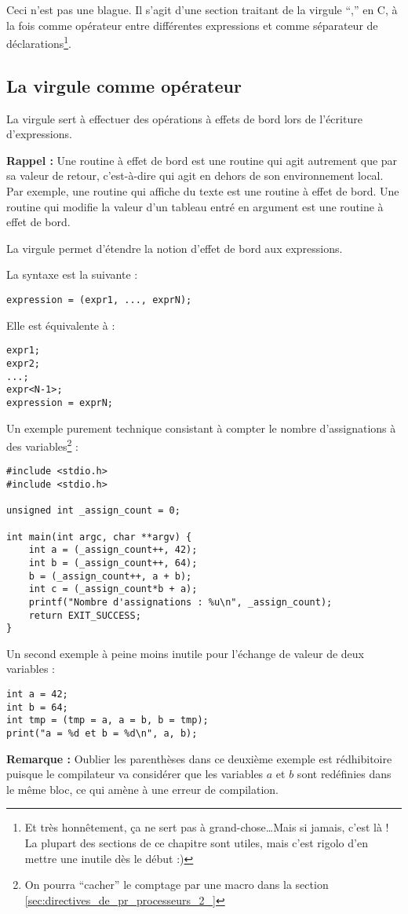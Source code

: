 \documentclass[../../../main.tex]{subfiles}
\begin{document}
Ceci n’est pas une blague. Il s’agit d’une section traitant de la virgule ``,'' en C, à la fois comme
opérateur entre différentes expressions et comme séparateur de déclarations\footnote{Et très honnêtement, ça ne sert pas à grand-chose\dots Mais si jamais, c’est là ! La plupart des sections de ce chapitre sont utiles, mais c'est rigolo d'en mettre une inutile dès le début :)}.
\subsection{La virgule comme opérateur}
\label{sub:la_virgule_comme_op_rateur}
La virgule sert à effectuer des opérations à effets de bord lors de l’écriture d’expressions.

\textbf{Rappel :} Une routine à effet de bord est une routine qui agit autrement que par sa valeur de retour,
c’est-à-dire qui agit en dehors de son environnement local. Par exemple, une routine qui affiche du
texte est une routine à effet de bord. Une routine qui modifie la valeur d’un tableau entré en argument
est une routine à effet de bord.

La virgule permet d'étendre la notion d'effet de bord aux expressions.

La syntaxe est la suivante :
\begin{verbatim}
expression = (expr1, ..., exprN);
\end{verbatim}
Elle est équivalente à :
\begin{verbatim}
expr1;
expr2;
...;
expr<N-1>;
expression = exprN;
\end{verbatim}
Un exemple purement technique consistant à compter le nombre d’assignations à des variables\footnote{On pourra ``cacher'' le comptage par une macro dans la section \ref{sec:directives_de_pr_processeurs_2_}} :
\begin{verbatim}
#include <stdio.h>
#include <stdio.h>

unsigned int _assign_count = 0;

int main(int argc, char **argv) {
	int a = (_assign_count++, 42);
	int b = (_assign_count++, 64);
	b = (_assign_count++, a + b);
	int c = (_assign_count*b + a);
	printf("Nombre d'assignations : %u\n", _assign_count);
	return EXIT_SUCCESS;
}
\end{verbatim}
Un second exemple à peine moins inutile pour l’échange de valeur de deux variables :
\begin{verbatim}
int a = 42;
int b = 64;
int tmp = (tmp = a, a = b, b = tmp);
print("a = %d et b = %d\n", a, b);
\end{verbatim}
\textbf{Remarque :} Oublier les parenthèses dans ce deuxième exemple est rédhibitoire puisque le compilateur
va considérer que les variables $a$ et $b$ sont redéfinies dans le même bloc, ce qui amène à une erreur de
compilation.
\end{document}
